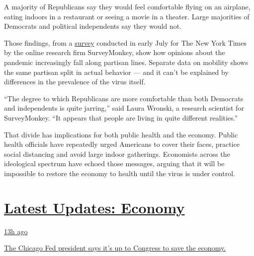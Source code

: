 A majority of Republicans say they would feel comfortable flying on an
airplane, eating indoors in a restaurant or seeing a movie in a theater.
Large majorities of Democrats and political independents say they would
not.

Those findings, from a
\href{https://www.surveymonkey.com/curiosity/nyt-july-2020-cci/}{survey}
conducted in early July for The New York Times by the online research
firm SurveyMonkey, show how opinions about the pandemic increasingly
fall along partisan lines. Separate data on mobility shows the same
partisan split in actual behavior --- and it can't be explained by
differences in the prevalence of the virus itself.

``The degree to which Republicans are more comfortable than both
Democrats and independents is quite jarring,'' said Laura Wronski, a
research scientist for SurveyMonkey. ``It appears that people are living
in quite different realities.''

That divide has implications for both public health and the economy.
Public health officials have repeatedly urged Americans to cover their
faces, practice social distancing and avoid large indoor gatherings.
Economists across the ideological spectrum have echoed those messages,
arguing that it will be impossible to restore the economy to health
until the virus is under control.

\hypertarget{latest-updates-economy}{%
\section{\texorpdfstring{\href{https://www.nytimes3xbfgragh.onion/live/2020/08/03/business/stock-market-today-coronavirus?action=click\&pgtype=Article\&state=default\&region=MAIN_CONTENT_1\&context=storylines_live_updates}{Latest
Updates:
Economy}}{Latest Updates: Economy}}\label{latest-updates-economy}}

\href{https://www.nytimes3xbfgragh.onion/live/2020/08/03/business/stock-market-today-coronavirus?action=click\&pgtype=Article\&state=default\&region=MAIN_CONTENT_1\&context=storylines_live_updates\#the-chicago-fed-president-says-its-up-to-congress-to-save-the-economy}{13h
ago}

\href{https://www.nytimes3xbfgragh.onion/live/2020/08/03/business/stock-market-today-coronavirus?action=click\&pgtype=Article\&state=default\&region=MAIN_CONTENT_1\&context=storylines_live_updates\#the-chicago-fed-president-says-its-up-to-congress-to-save-the-economy}{The
Chicago Fed president says it's up to Congress to save the economy.}


